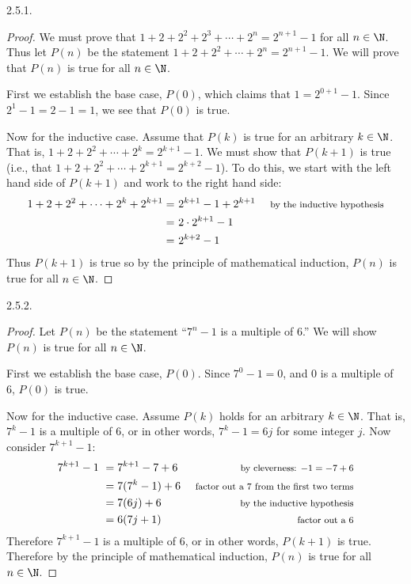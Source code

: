  \protect {} \protect \begin {itemize} 
\begin{ans}{2.5.1.}
		\begin{proof}
		 We must prove that $1 + 2 + 2^2 + 2^3 + \cdots +2^n = 2^{n+1} - 1$ for all $n \in \N$.  Thus let $P(n)$ be the statement $1 + 2 + 2^2 + \cdots + 2^n = 2^{n+1} - 1$.  We will prove that $P(n)$ is true for all $n \in \N$.

		 First we establish the base case, $P(0)$, which claims that $1 = 2^{0+1} -1$.  Since $2^1 - 1 = 2 - 1 = 1$, we see that $P(0)$ is true.

		 Now for the inductive case.  Assume that $P(k)$ is true for an arbitrary $k \in \N$.  That is, $1 + 2 + 2^2 + \cdots + 2^k = 2^{k+1} - 1$.  We must show that $P(k+1)$ is true (i.e., that $1 + 2 + 2^2 + \cdots + 2^{k+1} = 2^{k+2} - 1$).  To do this, we start with the left hand side of $P(k+1)$ and work to the right hand side:
		 \begin{align*}
		  1 + 2 + 2^2 + \cdots + 2^k + 2^{k+1} = &~ 2^{k+1} - 1 + 2^{k+1} & \mbox{ \footnotesize by the inductive hypothesis}\\
		   = & ~2\cdot 2^{k+1} - 1 & \\
		   = &~ 2^{k+2} - 1 &
		 \end{align*}
		Thus $P(k+1)$ is true so by the principle of mathematical induction, $P(n)$ is true for all $n \in \N$.
		\end{proof}
	
\end{ans}
\begin{ans}{2.5.2.}
		\begin{proof}
		 Let $P(n)$ be the statement ``$7^n - 1$ is a multiple of 6.''  We will show $P(n)$ is true for all $n \in \N$.

		 First we establish the base case, $P(0)$.  Since $7^0 - 1 = 0$, and $0$ is a multiple of 6, $P(0)$ is true.

		 Now for the inductive case.  Assume $P(k)$ holds for an arbitrary $k \in \N$.  That is, $7^k - 1$ is a multiple of 6, or in other words, $7^k - 1 = 6j$ for some integer $j$.  Now consider $7^{k+1} - 1$:
		 \begin{align*}
		  7^{k+1} - 1 ~ & = 7^{k+1} - 7 + 6 & \mbox{ \footnotesize by cleverness: $-1 = -7 + 6$}\\
		  & = 7(7^k - 1) + 6 & \mbox{ \footnotesize factor out a 7 from the first two terms}\\
		  & = 7(6j) + 6 & \mbox{ \footnotesize by the inductive hypothesis}\\
		  & = 6(7j + 1) & \mbox{ \footnotesize factor out a 6}
		 \end{align*}
		Therefore $7^{k+1} - 1$ is a multiple of 6, or in other words, $P(k+1)$ is true.  Therefore by the principle of mathematical induction, $P(n)$ is true for all $n \in \N$.
		\end{proof}
	

\end{ans}
\end{itemize}
